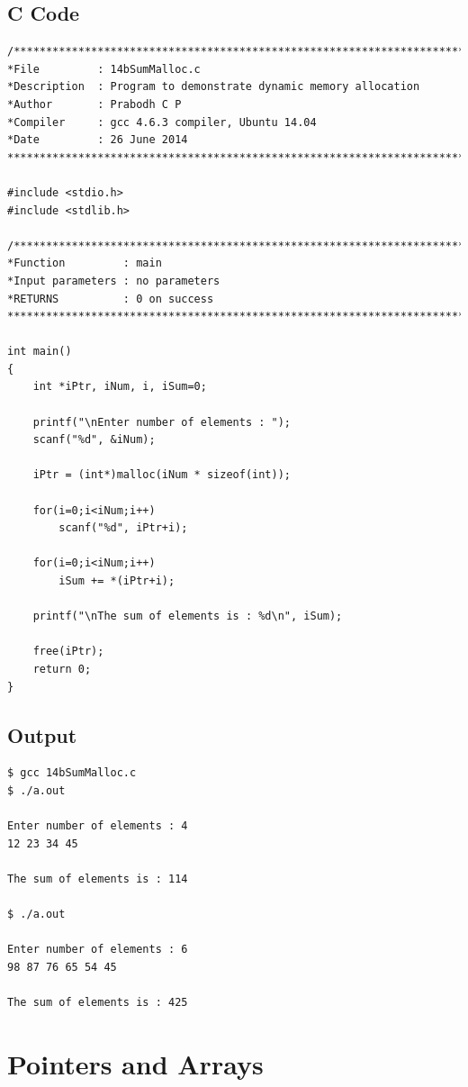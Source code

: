 \documentclass[a4paper]{report}
\begin{document}
\section*{C Code}

\begin{Verbatim}
/***************************************************************************
*File         : 14bSumMalloc.c
*Description  : Program to demonstrate dynamic memory allocation
*Author       : Prabodh C P
*Compiler     : gcc 4.6.3 compiler, Ubuntu 14.04
*Date         : 26 June 2014
***************************************************************************/

#include <stdio.h>
#include <stdlib.h>

/***************************************************************************
*Function         :	main
*Input parameters :	no parameters
*RETURNS          :	0 on success
***************************************************************************/

int main()
{
	int *iPtr, iNum, i, iSum=0;

	printf("\nEnter number of elements : ");
	scanf("%d", &iNum);

	iPtr = (int*)malloc(iNum * sizeof(int));

	for(i=0;i<iNum;i++)
		scanf("%d", iPtr+i);

	for(i=0;i<iNum;i++)
		iSum += *(iPtr+i);

	printf("\nThe sum of elements is : %d\n", iSum);

	free(iPtr);
	return 0;
}
\end{Verbatim}


\section*{Output}
\begin{Verbatim}
$ gcc 14bSumMalloc.c 
$ ./a.out 

Enter number of elements : 4
12 23 34 45

The sum of elements is : 114

$ ./a.out 

Enter number of elements : 6
98 87 76 65 54 45

The sum of elements is : 425
\end{Verbatim}


\chapter{Pointers and Arrays}
\end{document}
